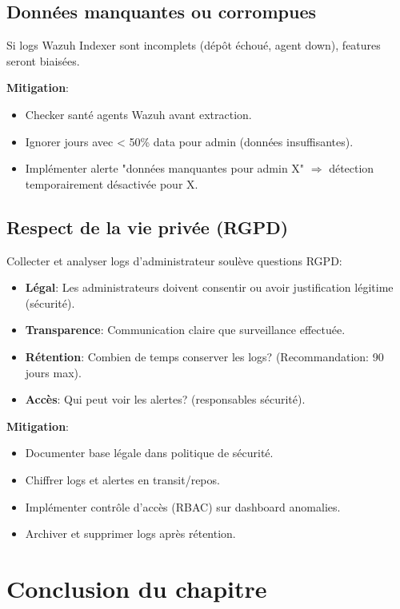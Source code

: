 \subsection{Données manquantes ou corrompues}

Si logs Wazuh Indexer sont incomplets (dépôt échoué, agent down), features seront biaisées.

\textbf{Mitigation}:
\begin{itemize}
	\item Checker santé agents Wazuh avant extraction.
	\item Ignorer jours avec < 50\% data pour admin (données insuffisantes).
	\item Implémenter alerte "données manquantes pour admin X" $\Rightarrow$ détection temporairement désactivée pour X.
\end{itemize}

\subsection{Respect de la vie privée (RGPD)}

Collecter et analyser logs d'administrateur soulève questions RGPD:
\begin{itemize}
	\item \textbf{Légal}: Les administrateurs doivent consentir ou avoir justification légitime (sécurité).
	\item \textbf{Transparence}: Communication claire que surveillance effectuée.
	\item \textbf{Rétention}: Combien de temps conserver les logs? (Recommandation: 90 jours max).
	\item \textbf{Accès}: Qui peut voir les alertes? (responsables sécurité).
\end{itemize}

\textbf{Mitigation}:
\begin{itemize}
	\item Documenter base légale dans politique de sécurité.
	\item Chiffrer logs et alertes en transit/repos.
	\item Implémenter contrôle d'accès (RBAC) sur dashboard anomalies.
	\item Archiver et supprimer logs après rétention.
\end{itemize}

\section{Conclusion du chapitre}

